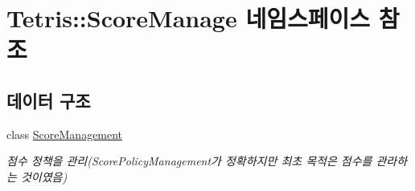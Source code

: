 \hypertarget{namespace_tetris_1_1_score_manage}{}\section{Tetris\+:\+:Score\+Manage 네임스페이스 참조}
\label{namespace_tetris_1_1_score_manage}
\subsection*{데이터 구조}
\begin{DoxyCompactItemize}
\item 
class \hyperlink{class_tetris_1_1_score_manage_1_1_score_management}{Score\+Management}
\begin{DoxyCompactList}\small\item\em 점수 정책을 관리(Score\+Policy\+Management가 정확하지만 최초 목적은 점수를 관라하는 것이였음) \end{DoxyCompactList}\end{DoxyCompactItemize}
